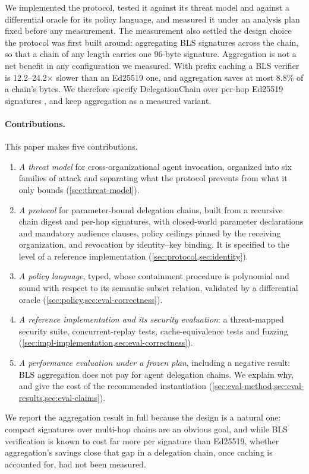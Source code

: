 \documentclass[11pt,a4paper]{article}
\begin{document}
We implemented the protocol, tested it against its threat model and
against a differential oracle for its policy language, and measured it
under an analysis plan fixed before any measurement. The measurement also
settled the design choice the protocol was first built around: aggregating
BLS signatures \citep{boneh2001bls,bgls2003aggregate} across the chain, so
that a chain of any length carries one 96-byte signature. Aggregation is
not a net benefit in any configuration we measured. With prefix caching a
BLS verifier is 12.2--24.2$\times$ slower than an Ed25519 one, and
aggregation saves at most 8.8\% of a chain's bytes. We therefore specify
DelegationChain over per-hop Ed25519 signatures \citep{rfc8032}, and keep
aggregation as a measured variant.

\paragraph{Contributions.}
This paper makes five contributions.
\begin{enumerate}
    \item \emph{A threat model} for cross-organizational agent invocation,
          organized into six families of attack and separating what the
          protocol prevents from what it only bounds
          (\cref{sec:threat-model}).
    \item \emph{A protocol} for parameter-bound delegation chains, built
          from a recursive chain digest and per-hop signatures, with
          closed-world parameter declarations and mandatory audience
          clauses, policy ceilings pinned by the receiving organization,
          and revocation by identity--key binding. It is specified to the
          level of a reference implementation
          (\cref{sec:protocol,sec:identity}).
    \item \emph{A policy language}, typed, whose containment procedure is
          polynomial and sound with respect to its semantic subset
          relation, validated by a differential oracle
          (\cref{sec:policy,sec:eval-correctness}).
    \item \emph{A reference implementation and its security evaluation}:
          a threat-mapped security suite, concurrent-replay tests,
          cache-equivalence tests and fuzzing
          (\cref{sec:impl-implementation,sec:eval-correctness}).
    \item \emph{A performance evaluation under a frozen plan}, including a
          negative result: BLS aggregation does not pay for agent
          delegation chains. We explain why, and give the cost of the
          recommended instantiation
          (\cref{sec:eval-method,sec:eval-results,sec:eval-claims}).
\end{enumerate}
We report the aggregation result in full because the design is a natural
one: compact signatures over multi-hop chains are an obvious goal, and
while BLS verification is known to cost far more per signature than
Ed25519, whether aggregation's savings close that gap in a delegation
chain, once caching is accounted for, had not been measured.
\end{document}
